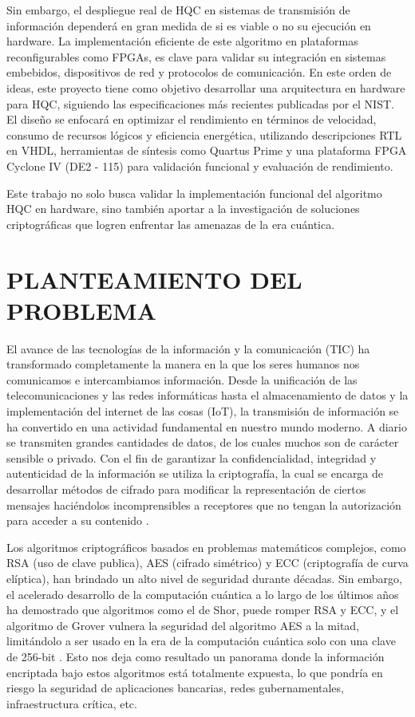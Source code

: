 Sin embargo, el despliegue real de HQC en sistemas de transmisión de información dependerá en gran medida de si es viable o no su ejecución en hardware. La implementación eficiente de este algoritmo en plataformas reconfigurables como FPGAs, es clave para validar su integración en sistemas embebidos, dispositivos de red y protocolos de comunicación. En este orden de ideas, este proyecto tiene como objetivo desarrollar una arquitectura en hardware para HQC, siguiendo las especificaciones más recientes publicadas por el NIST. El diseño se enfocará en optimizar el rendimiento en términos de velocidad, consumo de recursos lógicos y eficiencia energética, utilizando descripciones RTL en VHDL, herramientas de síntesis como Quartus Prime y una plataforma FPGA Cyclone IV (DE2 - 115) para validación funcional y evaluación de rendimiento.

Este trabajo no solo busca validar la implementación funcional del algoritmo HQC en hardware, sino también aportar a la investigación de soluciones criptográficas que logren enfrentar las amenazas de la era cuántica.




\chapter{PLANTEAMIENTO DEL PROBLEMA} 

\label{Cap:Planteamientodelproblema}
El avance de las tecnologías de la información y la comunicación (TIC) ha transformado completamente la manera en la que los seres humanos nos comunicamos e intercambiamos información. Desde la unificación de las telecomunicaciones y las redes informáticas hasta el almacenamiento de datos y la implementación del internet de las cosas (IoT), la transmisión de información se ha convertido en una actividad fundamental en nuestro mundo moderno. A diario se transmiten grandes cantidades de datos, de los cuales muchos son de carácter sensible o privado. Con el fin de garantizar la confidencialidad, integridad y autenticidad de la información se utiliza la criptografía, la cual se encarga de desarrollar métodos de cifrado para modificar la representación de ciertos mensajes haciéndolos incomprensibles a receptores que no tengan la autorización para acceder a su contenido \cite{IBMQuantumSafe2024}.

Los algoritmos criptográficos basados en problemas matemáticos complejos, como RSA (uso de clave publica), AES (cifrado simétrico) y ECC (criptografía de curva elíptica), han brindado un alto nivel de seguridad durante décadas. Sin embargo, el acelerado desarrollo de la computación cuántica a lo largo de los últimos años ha demostrado que algoritmos como el de Shor, puede romper RSA y ECC, y el algoritmo de Grover vulnera la seguridad del algoritmo AES a la mitad, limitándolo a ser usado en la era de la computación cuántica solo con una clave de 256-bit \cite{SinghSakk2024}. Esto nos deja como resultado un panorama donde la información encriptada bajo estos algoritmos está totalmente expuesta, lo que pondría en riesgo la seguridad de aplicaciones bancarias, redes gubernamentales, infraestructura crítica, etc.

